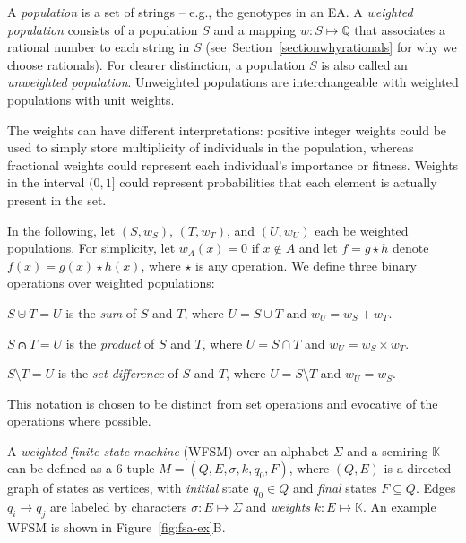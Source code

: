 \documentclass{llncs}
\begin{document}
A \emph{population} is a set of strings -- e.g., the genotypes in an EA.
A \emph{weighted population} consists of a population $S$ and a mapping $w : S \mapsto \mathbb{Q}$ that associates a rational number to each string in $S$ (see~Section~\ref{sectionwhyrationals} for why we choose rationals).
For clearer distinction, a population $S$ is also called an \emph{unweighted population}.
Unweighted populations are interchangeable with weighted populations with unit weights.

The weights can have different interpretations:
positive integer weights could be used to simply store multiplicity of individuals in the population,
whereas fractional weights could represent each individual's importance or fitness.
Weights in the interval $(0,1]$ could represent probabilities that each element is actually present in the set.

In the following, let $(S, w_S)$, $(T, w_T)$, and $(U, w_U)$ each be weighted populations.
For simplicity, let $w_A(x)=0$ if $x \notin A$ and let $f = g \star h$ denote $f(x) = g(x) \star h(x)$, where $\star$ is any operation.
We define three binary operations over weighted populations:

$S \uplus T = U$ is the \emph{sum} of $S$ and $T$, where $U = S \cup T$ and $w_U = w_S + w_T$.

$S \capdot T = U$ is the \emph{product} of $S$ and $T$, where $U = S \cap T$ and $w_U = w_S \times w_T$.

$S \setminus T = U$ is the \emph{set difference} of $S$ and $T$, where $U = S \setminus T$ and $w_U = w_S$.

This notation is chosen to be distinct from set operations and evocative of the operations where possible.


A \emph{weighted finite state machine} (WFSM) over an alphabet $\Sigma$ and a semiring $\mathbb{K}$ can be defined as a 6-tuple $M = (Q, E, \sigma, k, q_0, F)$,
where $(Q,E)$ is a directed graph of states as vertices,
with \emph{initial} state $q_0 \in Q$ and \emph{final} states $F \subseteq Q$.
Edges $q_i \to q_j$ are labeled by characters $\sigma : E \mapsto \Sigma$ and \emph{weights} $k : E \mapsto \mathbb{K}$.
An example WFSM is shown in Figure~\ref{fig:fsa-ex}B.
\end{document}

